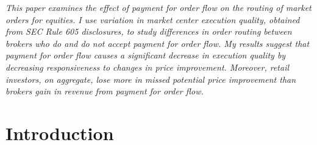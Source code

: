 \documentclass[12pt,a4paper]{extarticle}
\begin{document}
	
\title{}

\author[]{Saketh Aleti}


\date{\vspace{-1em}\small{April 30, 2018}}

\maketitle


\begin{addmargin}[0.5in]{0.5in}
\textit{This paper examines the effect of payment for order flow on the routing of market orders for equities. I use variation in market center execution quality, obtained from SEC Rule 605 disclosures, to study differences in order routing between brokers who do and do not accept payment for order flow. My results suggest that payment for order flow causes a significant decrease in execution quality by decreasing responsiveness to changes in price improvement. Moreover, retail investors, on aggregate, lose more in missed potential price improvement than brokers gain in revenue from payment for order flow.
}
\end{addmargin}





\section{Introduction}	
\end{document}
